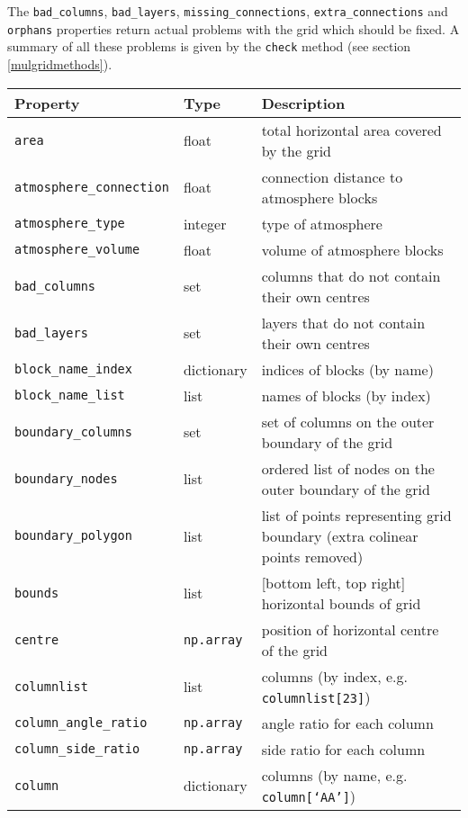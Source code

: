 The \texttt{bad\_columns}, \texttt{bad\_layers}, \texttt{missing\_connections}, \texttt{extra\_connections} and \texttt{orphans} properties return actual problems with the grid which should be fixed.  A summary of all these problems is given by the \texttt{check} method (see section \ref{mulgridmethods}).

\begin{center}
  \begin{longtable}{|l|l|p{75mm}|}
    \hline
    \textbf{Property} & \textbf{Type} & \textbf{Description}\\
    \hline
    \texttt{area} & float & total horizontal area covered by the grid \\
    \texttt{atmosphere\_connection} & float & connection distance to atmosphere blocks\\
    \texttt{atmosphere\_type} & integer & type of atmosphere\\
    \texttt{atmosphere\_volume} & float & volume of atmosphere blocks\\
    \texttt{bad\_columns} & set & columns that do not contain their own centres\\
    \texttt{bad\_layers} & set & layers that do not contain their own centres\\
    \texttt{block\_name\_index} & dictionary & indices of blocks (by name)\\
    \texttt{block\_name\_list} & list & names of blocks (by index)\\
    \texttt{boundary\_columns} & set & set of columns on the outer boundary of the grid \\
    \texttt{boundary\_nodes} & list & ordered list of nodes on the outer boundary of the grid \\
    \texttt{boundary\_polygon} & list & list of points representing grid boundary (extra colinear points removed) \\
    \texttt{bounds} & list & [bottom left, top right] horizontal bounds of grid\\
    \texttt{centre} & \texttt{np.array} & position of horizontal centre of the grid \\
    \texttt{columnlist} & list & columns (by index, e.g. \texttt{columnlist[23]})\\
    \texttt{column\_angle\_ratio} & \texttt{np.array} & angle ratio for each column\\
    \texttt{column\_side\_ratio} & \texttt{np.array} & side ratio for each column\\
    \texttt{column} & dictionary & columns (by name, e.g. \texttt{column[`AA']})\\

\end{longtable}
\end{center}
